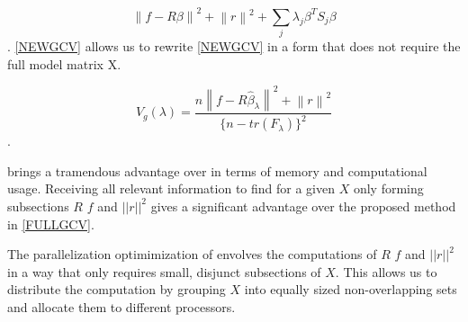 \documentclass{article}
\begin{document}
    \begin{equation} \label{NEWGCV} \left \| f- R\beta \right \|^2 + \left \| r \right \|^2 + \sum_{j}^{ } \lambda_j \beta^T S_j \beta \end{equation}. \ref{NEWGCV} allows us to rewrite \ref{NEWGCV} in a form that does not require the full model matrix X.

    \begin{equation} \label{NEWNEWGCV} V_g(\lambda) = \frac{n\left \| f-R\widehat{\beta}_\lambda \right \| ^2 + \left  \| r \right \| ^2}{\{n-tr(F_\lambda) \}^2} \end{equation}.

    \label{NEWNEWGCV} brings a tramendous advantage over \label{FULLGCV} in terms of memory and computational usage. Receiving all relevant information to find \textlambda for a given $X$ only forming subsections $R$ $f$ and $||r||^2$ gives a significant advantage over the proposed method in \ref{FULLGCV}.

    The parallelization optimimization of \label{FULLGCV} envolves the computations of $R$ $f$ and $||r||^2$ in a way that only requires small, disjunct subsections of $X$. This allows us to distribute the computation by grouping $X$ into equally sized non-overlapping sets and allocate them to different processors.
\end{document}
